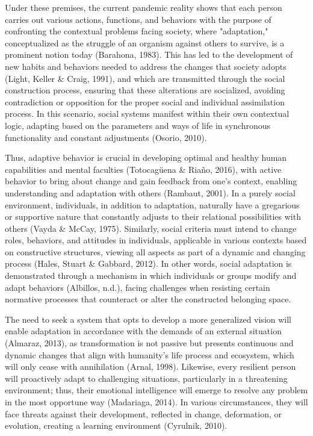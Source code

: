 \documentclass{article}
\begin{document}
Under these premises, the current pandemic reality shows that each person carries out various actions, functions, and behaviors with the purpose of confronting the contextual problems facing society, where "adaptation," conceptualized as the struggle of an organism against others to survive, is a prominent notion today (Barahona, 1983). This has led to the development of new habits and behaviors needed to address the changes that society adopts (Light, Keller \& Craig, 1991), and which are transmitted through the social construction process, ensuring that these alterations are socialized, avoiding contradiction or opposition for the proper social and individual assimilation process. In this scenario, social systems manifest within their own contextual logic, adapting based on the parameters and ways of life in synchronous functionality and constant adjustments (Osorio, 2010).

Thus, adaptive behavior is crucial in developing optimal and healthy human capabilities and mental faculties (Totocagüena \& Riaño, 2016), with active behavior to bring about change and gain feedback from one's context, enabling understanding and adaptation with others (Rambaut, 2001). In a purely social environment, individuals, in addition to adaptation, naturally have a gregarious or supportive nature that constantly adjusts to their relational possibilities with others (Vayda \& McCay, 1975). Similarly, social criteria must intend to change roles, behaviors, and attitudes in individuals, applicable in various contexts based on constructive structures, viewing all aspects as part of a dynamic and changing process (Hales, Stuart \& Gabbard, 2012). In other words, social adaptation is demonstrated through a mechanism in which individuals or groups modify and adapt behaviors (Albillos, n.d.), facing challenges when resisting certain normative processes that counteract or alter the constructed belonging space.

The need to seek a system that opts to develop a more generalized vision will enable adaptation in accordance with the demands of an external situation (Almaraz, 2013), as transformation is not passive but presents continuous and dynamic changes that align with humanity's life process and ecosystem, which will only cease with annihilation (Arnal, 1998). Likewise, every resilient person will proactively adapt to challenging situations, particularly in a threatening environment; thus, their emotional intelligence will emerge to resolve any problem in the most opportune way (Madariaga, 2014). In various circumstances, they will face threats against their development, reflected in change, deformation, or evolution, creating a learning environment (Cyrulnik, 2010).
\end{document}

